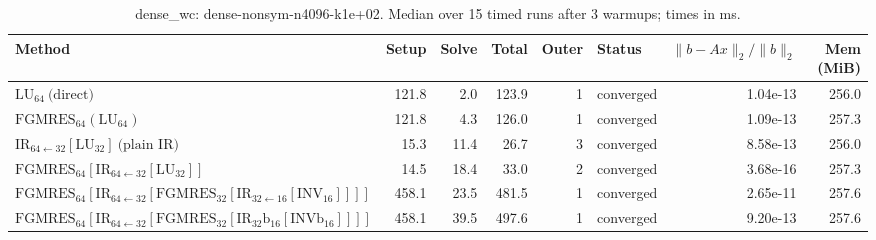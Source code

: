 \begin{table}[t]
\centering
\small
\caption{dense_wc: dense-nonsym-n4096-k1e+02. Median over 15 timed runs after 3 warmups; times in ms.}
\label{tab:dense_wc-dense-nonsym-n4096-k1e+02}
\begin{tabular}{lrrrrlrr}
\hline
Method & Setup & Solve & Total & Outer & Status & $\|b-Ax\|_2/\|b\|_2$ & Mem (MiB) \\
\hline
$\mathrm{LU}_{64}\ \text{(direct)}$ & 121.8 & 2.0 & 123.9 & 1 & converged & 1.04e-13 & 256.0 \\
$\mathrm{FGMRES}_{64}(\mathrm{LU}_{64})$ & 121.8 & 4.3 & 126.0 & 1 & converged & 1.09e-13 & 257.3 \\
$\mathrm{IR}_{64\leftarrow 32}[\mathrm{LU}_{32}]\ \text{(plain IR)}$ & 15.3 & 11.4 & 26.7 & 3 & converged & 8.58e-13 & 256.0 \\
$\mathrm{FGMRES}_{64}[\mathrm{IR}_{64\leftarrow 32}[\mathrm{LU}_{32}]]$ & 14.5 & 18.4 & 33.0 & 2 & converged & 3.68e-16 & 257.3 \\
$\mathrm{FGMRES}_{64}[\mathrm{IR}_{64\leftarrow 32}[\mathrm{FGMRES}_{32}[\mathrm{IR}_{32\leftarrow 16}[\mathrm{INV}_{16}]]]]$ & 458.1 & 23.5 & 481.5 & 1 & converged & 2.65e-11 & 257.6 \\
$\mathrm{FGMRES}_{64}[\mathrm{IR}_{64\leftarrow 32}[\mathrm{FGMRES}_{32}[\mathrm{IR}_{32}{\mathrm{b}_{16}}[\mathrm{INVb}_{16}]]]]$ & 458.1 & 39.5 & 497.6 & 1 & converged & 9.20e-13 & 257.6 \\
\hline
\end{tabular}
\end{table}
